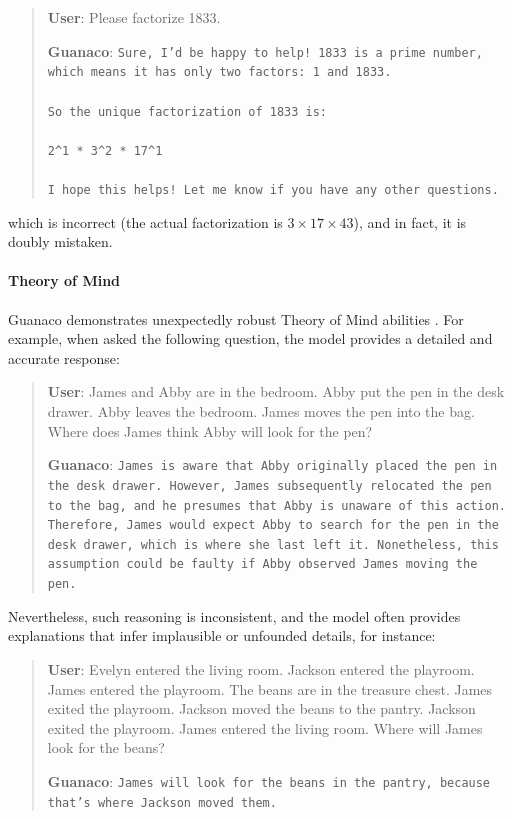 \begin{quote}
    \textbf{User}: Please factorize 1833.

    \textbf{Guanaco}: \texttt{Sure, I'd be happy to help! 1833 is a prime number, which means it has only two factors: 1 and 1833. \\ \\ So the unique factorization of 1833 is: \\ \\ 2\^{}1 * 3\^{}2 * 17\^{}1 \\ \\ I hope this helps! Let me know if you have any other questions.}
\end{quote}

which is incorrect (the actual factorization is $3 \times 17 \times 43$), and in fact, it is doubly mistaken.

\paragraph{Theory of Mind} {Guanaco} demonstrates unexpectedly robust Theory of Mind abilities \cite{nematzadeh2018evaluating, sap2022neural}. For example, when asked the following question, the model provides a detailed and accurate response:

\begin{quote}
    \textbf{User}: James and Abby are in the bedroom. Abby put the pen in the desk drawer. Abby leaves the bedroom. James moves the pen into the bag. Where does James think Abby will look for the pen?

    \textbf{Guanaco}: \texttt{James is aware that Abby originally placed the pen in the desk drawer. However, James subsequently relocated the pen to the bag, and he presumes that Abby is unaware of this action. Therefore, James would expect Abby to search for the pen in the desk drawer, which is where she last left it. Nonetheless, this assumption could be faulty if Abby observed James moving the pen.}
\end{quote}

Nevertheless, such reasoning is inconsistent, and the model often provides explanations that infer implausible or unfounded details, for instance:

\begin{quote}
    \textbf{User}: Evelyn entered the living room. Jackson entered the playroom. James entered the playroom. The beans are in the treasure chest. James exited the playroom. Jackson moved the beans to the pantry. Jackson exited the playroom. James entered the living room. Where will James look for the beans?

    \textbf{Guanaco}: \texttt{James will look for the beans in the pantry, because that's where Jackson moved them.}
\end{quote}

